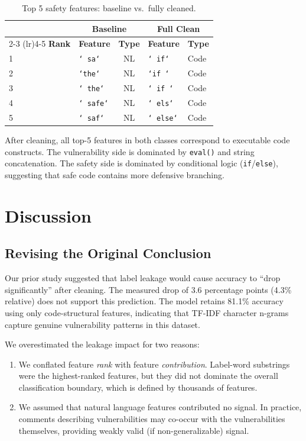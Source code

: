 \documentclass[11pt,a4paper]{article}
\begin{document}
\begin{table}[H]
\centering
\caption{Top 5 safety features: baseline vs.\ fully cleaned.}
\begin{tabular}{llcll}
\toprule
& \multicolumn{2}{c}{\textbf{Baseline}} & \multicolumn{2}{c}{\textbf{Full Clean}} \\
\cmidrule(lr){2-3} \cmidrule(lr){4-5}
\textbf{Rank} & \textbf{Feature} & \textbf{Type} & \textbf{Feature} & \textbf{Type} \\
\midrule
1 & \texttt{` sa`} & NL & \texttt{` if`} & Code \\
2 & \texttt{`the`} & NL & \texttt{`if `} & Code \\
3 & \texttt{` the`} & NL & \texttt{` if `} & Code \\
4 & \texttt{` safe`} & NL & \texttt{` els`} & Code \\
5 & \texttt{` saf`} & NL & \texttt{` else`} & Code \\
\bottomrule
\end{tabular}
\end{table}

After cleaning, all top-5 features in both classes correspond to executable code constructs. The vulnerability side is dominated by \texttt{eval()} and string concatenation. The safety side is dominated by conditional logic (\texttt{if}/\texttt{else}), suggesting that safe code contains more defensive branching.

\section{Discussion}

\subsection{Revising the Original Conclusion}

Our prior study suggested that label leakage would cause accuracy to ``drop significantly'' after cleaning. The measured drop of 3.6 percentage points (4.3\% relative) does not support this prediction. The model retains 81.1\% accuracy using only code-structural features, indicating that TF-IDF character n-grams capture genuine vulnerability patterns in this dataset.

We overestimated the leakage impact for two reasons:
\begin{enumerate}
    \item We conflated feature \textit{rank} with feature \textit{contribution}. Label-word substrings were the highest-ranked features, but they did not dominate the overall classification boundary, which is defined by thousands of features.
    \item We assumed that natural language features contributed no signal. In practice, comments describing vulnerabilities may co-occur with the vulnerabilities themselves, providing weakly valid (if non-generalizable) signal.
\end{enumerate}
\end{document}
